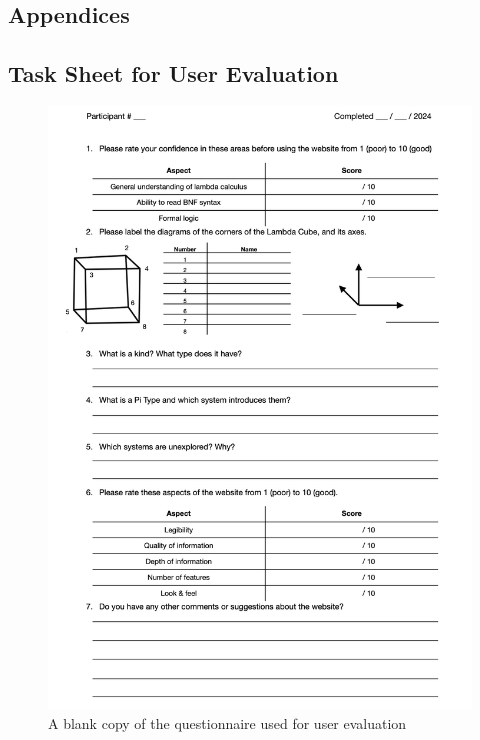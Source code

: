 \documentclass{l4proj}
\begin{document}
\begin{appendices}

\chapter{Appendices}

\section{Task Sheet for User Evaluation}

\begin{figure}[h!]
    \centering
    \includegraphics[width=0.8\linewidth]{dissertation/images/questions.png}
    \caption{A blank copy of the questionnaire used for user evaluation}
    \label{fig:enter-label}
\end{figure}

\end{appendices}






\end{document}
